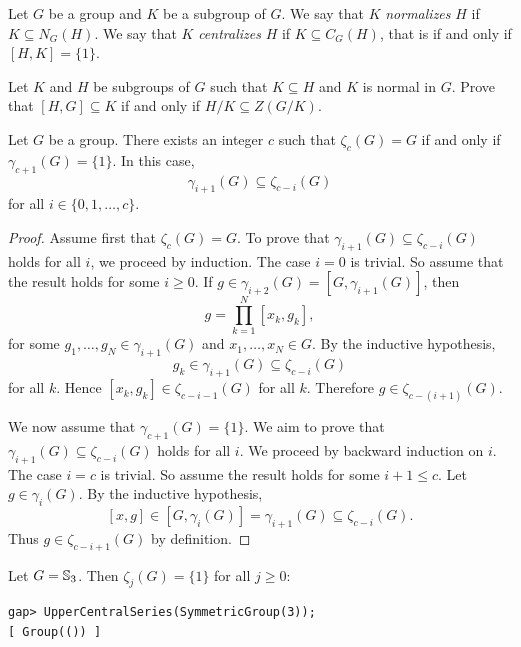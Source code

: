 


Let $G$ be a group and $K$ be a subgroup of $G$. We say that $K$ \emph{normalizes} 
$H$ if $K\subseteq N_G(H)$.
We say that $K$ \emph{centralizes} 
$H$ if $K\subseteq C_G(H)$, that is if and only if $[H,K]=\{1\}$.

\begin{exercise}
Let $K$ and $H$ be subgroups of $G$ such that $K\subseteq H$ and $K$ is normal in $G$.
Prove that $[H,G]\subseteq K$ if and only if $H/K\subseteq Z(G/K)$. 
\end{exercise}

\begin{lemma}
\label{lem:gamma_zeta}
Let $G$ be a group. There exists an integer $c$ such that 
$\zeta_c(G)=G$ if and only if 
$\gamma_{c+1}(G)=\{1\}$. In this case, 
\[
\gamma_{i+1}(G)\subseteq\zeta_{c-i}(G)
\]
for all $i\in\{0,1,\dots,c\}$. 
\end{lemma}

\begin{proof}
Assume first that $\zeta_c(G)=G$. To prove that 
$\gamma_{i+1}(G)\subseteq\zeta_{c-i}(G)$ holds for all $i$, we proceed by induction. 
The case $i=0$ is trivial. So assume that the result holds for some $i\geq0$. If
$g\in\gamma_{i+2}(G)=[G,\gamma_{i+1}(G)]$, then     
\[
g=\prod_{k=1}^N [x_k,g_k],
\]
for some $g_1,\dots,g_N\in\gamma_{i+1}(G)$ and $x_1,\dots,x_N\in G$. By the inductive 
hypothesis, 
	\[
	g_k\in\gamma_{i+1}(G)\subseteq\zeta_{c-i}(G)
	\]
for all $k$. Hence $[x_k,g_k]\in\zeta_{c-i-1}(G)$ for all $k$. Therefore   
$g\in\zeta_{c-(i+1)}(G)$. 
	
We now assume that $\gamma_{c+1}(G)=\{1\}$. We aim to prove that 
$\gamma_{i+1}(G)\subseteq\zeta_{c-i}(G)$ holds for all $i$. We proceed by backward induction on $i$. 
The case $i=c$ is trivial. So assume the result holds for some $i+1\leq c$. 
Let $g\in\gamma_{i}(G)$. By the inductive hypothesis, 
	\[
	[x,g]\in [G,\gamma_i(G)]=\gamma_{i+1}(G)\subseteq\zeta_{c-i}(G).
	\]
Thus $g\in\zeta_{c-i+1}(G)$ by definition. 
\end{proof}

\begin{example}
Let $G=\mathbb{S}_3$. Then $\zeta_j(G)=\{1\}$ for all $j\geq 0$: 
\begin{lstlisting}
gap> UpperCentralSeries(SymmetricGroup(3));
[ Group(()) ]
\end{lstlisting}
\end{example}

